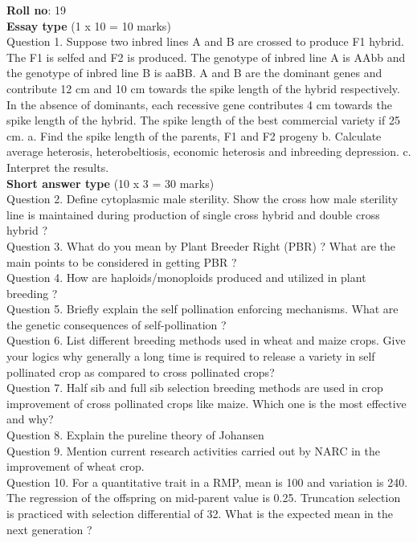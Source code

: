 \documentclass[12pt]{article}\usepackage[]{graphicx}\usepackage[]{color}
\begin{document}
\textbf{Roll no}: 19 \\[0.5cm] 
\textbf{Essay type} (1 x 10 = 10 marks) \\
Question 1. Suppose two inbred lines A and B are crossed to produce F1 hybrid. The F1 is selfed and F2 is produced. The genotype of inbred line A is AAbb and the genotype of inbred line B is aaBB. A and B are the dominant genes and contribute 12 cm and 10 cm towards the spike length of the hybrid respectively. In the absence of dominants, each recessive gene contributes 4 cm towards the spike length of the hybrid. The spike length of the best commercial variety if 25 cm. a. Find the spike length of the parents, F1 and F2 progeny b. Calculate average heterosis, heterobeltiosis, economic heterosis and inbreeding depression. c. Interpret the results.\\
\textbf{Short answer type} (10 x 3 = 30 marks) \\
Question 2. Define cytoplasmic male sterility. Show the cross how male sterility line is maintained during production of single cross hybrid and double cross hybrid ?\\
Question 3. What do you mean by Plant Breeder Right (PBR) ? What are the main points to be considered in getting PBR ?\\
Question 4. How are haploids/monoploids produced and utilized in plant breeding ?\\
Question 5. Briefly explain the self pollination enforcing mechanisms. What are the genetic consequences of self-pollination ?\\
Question 6. List different breeding methods used in wheat and maize crops. Give your logics why generally a long time is required to release a variety in self pollinated crop as compared to cross pollinated crops?\\
Question 7. Half sib and full sib selection breeding methods are used in crop improvement of cross pollinated crops like maize. Which one is the most effective and why?\\
Question 8. Explain the pureline theory of Johansen\\
Question 9. Mention current research activities carried out by NARC in the improvement of wheat crop.\\
Question 10. For a quantitative trait in a RMP, mean is 100 and variation is 240. The regression of the offspring on mid-parent value is 0.25. Truncation selection is practiced with selection differential of 32. What is the expected mean in the next generation ?\\
\end{document}
